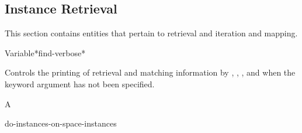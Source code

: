 \documentclass[10pt,twoside,english,pdftex]{article}
\begin{document}

\T\markright{}%
\T\pagestyle{plain}
\T\clearpage
\W{}
\T\pagestyle{fancy}
\T\thispagestyle{fancybottom}
\T\global\def\fnlastname{ }%

\subsection{Instance Retrieval}
\label{sec:retrieval}%

This section contains  entities that pertain to
 retrieval and  iteration and
mapping.


\W\entities
\T\clearpage


\begin{functiondoc}{Variable}{*find-verbose*}{}%

\fnsyntax

\fnpurpose Controls the printing of retrieval and matching information by
,
,
, and
 when
the keyword argument  has not been specified.

\fnpackage {}

\fnmodule {}

\fnvaluetype A 

\fninitialvalue \nil

\begin{alsos}{do-instances-on-space-instances}
\end{alsos}

\end{functiondoc}

\end{document}
